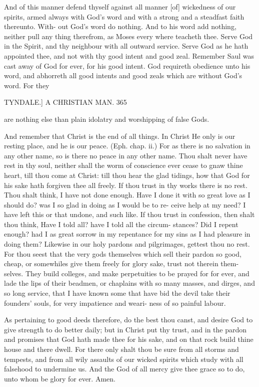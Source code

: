 \documentclass{custom}
\begin{document}
{And of this manner defend thyself against all manner [of] 
wickedness of our spirits, armed always with God's word 
and with a strong and a steadfast faith thereunto. With- 
out God's word do nothing. And to his word add nothing, 
neither pull any thing therefrom, as Moses every where 
teacheth thee. Serve God in the Spirit, and thy 
neighbour with all outward service. Serve God as 
he hath appointed thee, and not with thy good intent 
and good zeal. Remember Saul was cast away of 
God for ever, for his good intent. God requireth 
obedience unto his word, and abhorreth all good intents 
and good zeals which are without God's word. For they 


TYNDALE.] A CHRISTIAN MAN. 365

are nothing else than plain idolatry and worshipping of 
false Gods. 

And remember that Christ is the end of all things. In Christ 
He only is our resting place, and he is our peace.
(Eph. chap. ii.) For as there is no salvation in any other
name, so is there no peace in any other name. Thou 
shalt never have rest in thy soul, neither shall the worm of 
conscience ever cease to gnaw thine heart, till thou come 
at Christ: till thou hear the glad tidings, how that God 
for his sake hath forgiven thee all freely. If thou trust in 
thy works there is no rest. Thou shalt think, I have not 
done enough. Have I done it with so great love as I 
should do? was I so glad in doing as I would be to re- 
ceive help at my need? I have left this or that undone, and 
such like. If thou trust in confession, then shalt thou 
think, Have I told all? have I told all the circum- 
stances? Did I repent enough? had I as great sorrow in 
my repentance for my sins as I had pleasure in doing them? 
Likewise in our holy pardons and pilgrimages, gettest thou 
no rest. For thou seest that the very gods themselves 
which sell their pardon so good, cheap, or somewhiles 
give them freely for glory sake, trust not therein them- 
selves. They build colleges, and make perpetuities to be 
prayed for for ever, and lade the lips of their beadmen, 
or chaplains with so many masses, and dirges, and so long 
service, that I have known some that have bid the devil 
take their founders' souls, for very impatience and weari-
ness of so painful labour. 

As pertaining to good deeds therefore, do the best
thou canst, and desire God to give strength to do better
daily; but in Christ put thy trust, and in the pardon
and promises that God hath made thee for his sake, and 
on that rock build thine house and there dwell. For there 
only shalt thou be sure from all storms and tempests, and 
from all wily assaults of our wicked spirits which study with 
all falsehood to undermine us. And the God of all mercy 
give thee grace so to do, unto whom be glory for ever. Amen. 


}
\end{document}
